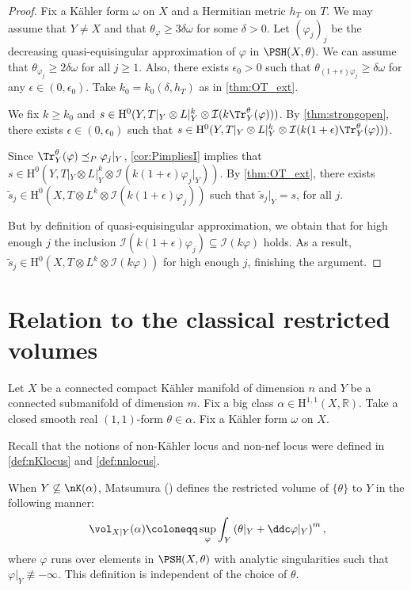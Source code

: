 \begin{proof}
Fix a Kähler form $\omega$ on $X$ and a Hermitian metric $h_T$ on $T$.
We may assume that $Y\neq X$ and that $\theta_{\varphi} \geq 3\delta \omega$ for some $\delta>0$. Let $(\varphi_j)_j$ be the decreasing quasi-equisingular approximation of $\varphi$ in $\PSH(X,\theta)$. We can assume that $\theta_{\varphi_j} \geq 2\delta \omega$ for all $j\geq 1$. Also, there exists $\epsilon_0 >0$ such that $\theta_{(1+\epsilon)\varphi_j} \geq \delta \omega$ for any $\epsilon \in (0,\epsilon_0)$. Take $k_0=k_0(\delta,h_T)$ as in \cref{thm:OT_ext}.


We fix $k \geq k_0$ and $s \in \mathrm{H}^0(Y, T|_Y\otimes L|_Y^k\otimes \mathcal{I}(k\Tr_Y^{\theta}(\varphi)))$. By \cref{thm:strongopen}, there exists $\epsilon \in (0,\epsilon_0)$ such that $s \in \mathrm{H}^0(Y, T|_Y\otimes L|_Y^k\otimes \mathcal{I}(k(1+\epsilon)\Tr_Y^{\theta}(\varphi)))$.

Since $\Tr_Y^{\theta}(\varphi) \preceq_P \varphi_j|_Y$, \cref{cor:PimpliesI} implies that $s \in \mathrm{H}^0(Y, T|_Y\otimes L|_Y^k\otimes \mathcal{I}(k(1+\epsilon)\varphi_j|_Y))$. By \cref{thm:OT_ext}, there exists $\tilde s_j \in \mathrm{H}^0(X, T\otimes L^k \otimes \mathcal{I}(k(1+\epsilon)\varphi_j))$ such that $\tilde s_j|_Y =s$, for all $j$.

But by definition of quasi-equisingular approximation, we obtain that for high enough $j$ the inclusion $\mathcal{I}(k(1+\epsilon)\varphi_j) \subseteq \mathcal{I}(k\varphi)$ holds. As a result, $\tilde s_j \in \mathrm{H}^0(X, T\otimes L^k \otimes \mathcal{I}(k\varphi))$ for high enough $j$, finishing the argument.
\end{proof}


\section{Relation to the classical restricted volumes}\label{sec:rv}
Let $X$ be a connected compact Kähler manifold of dimension $n$ and $Y$ be a connected submanifold of dimension $m$. Fix a big class $\alpha\in \mathrm{H}^{1,1}(X,\mathbb{R})$. Take a closed smooth real $(1,1)$-form $\theta\in \alpha$. Fix a Kähler form $\omega$ on $X$.

Recall that the notions of non-Kähler locus and non-nef locus were defined in \cref{def:nKlocus} and \cref{def:nnlocus}.

When $Y\not\subseteq \nK(\alpha)$, Matsumura (\cite[Definition~1.4]{Mat13}) defines the restricted volume of $\{\theta\}$ to $Y$ in the following manner:
\begin{equation}\label{eq:rest_vol_Mat_def}
        \vol_{X|Y}(\alpha)\coloneqq \sup_{\varphi} \int_Y \left(\theta|_Y+\ddc \varphi|_Y\right)^{m},
\end{equation}
where $\varphi$ runs over elements in $\PSH(X,\theta)$ with analytic singularities such that $\varphi|_Y\not\equiv -\infty$. This definition is independent of the choice of $\theta$.

